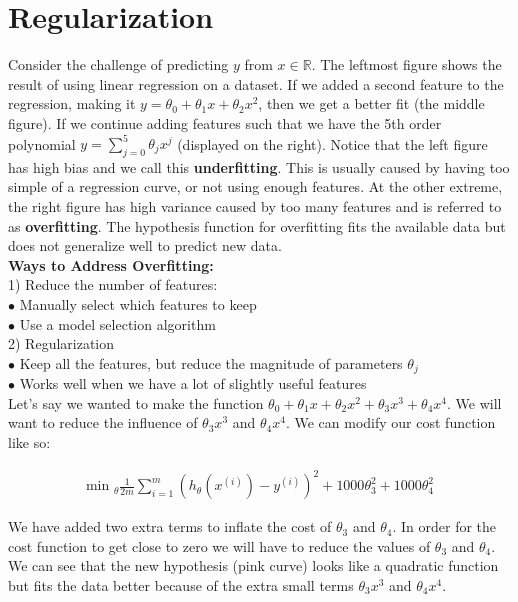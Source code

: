 \documentclass{article}
\begin{document}
    \section{Regularization}
        Consider the challenge of predicting $y$ from $x\in\mathbb{R}$. The leftmost figure shows the result
        of using linear regression on a dataset. If we added a second feature to the regression, making it
        $y=\theta_0+\theta_1 x+\theta_2 x^2$, then we get a better fit (the middle figure). If we continue
        adding features such that we have the 5th order polynomial $y=\sum^5_{j=0}\theta_j x^j$ (displayed
        on the right). Notice that the left figure has high bias and we call this \textbf{underfitting}.
        This is usually caused by having too simple of a regression curve, or not using enough features.
        At the other extreme, the right figure has high variance caused by too many features and is referred
        to as \textbf{overfitting}. The hypothesis function for overfitting fits the available data but
        does not generalize well to predict new data. \\

        \noindent \textbf{Ways to Address Overfitting:} \\
        1) Reduce the number of features: \\
        $\bullet$ Manually select which features to keep \\
        $\bullet$ Use a model selection algorithm \\
        2) Regularization \\
        $\bullet$ Keep all the features, but reduce the magnitude of parameters $\theta_j$ \\
        $\bullet$ Works well when we have a lot of slightly useful features \\

        \noindent Let's say we wanted to make the function $\theta_0 + \theta_1 x + \theta_2 x^2 + \theta_3 x^3
        + \theta_4 x^4$. We will want to reduce the influence of $\theta_3 x^3$ and $\theta_4 x^4$. We can
        modify our cost function like so:

        \begin{align*}
            \text{min }_{\theta} \frac{1}{2m} \sum^m_{i=1}(h_\theta(x^{(i)})-y^{(i)})^2 + 1000\theta^2_3 +
            1000\theta^2_4
        \end{align*}

        \noindent We have added two extra terms to inflate the cost of $\theta_3$ and $\theta_4$. In order for
        the cost function to get close to zero we will have to reduce the values of $\theta_3$ and $\theta_4$.
        We can see that the new hypothesis (pink curve) looks like a quadratic function but fits the data
        better because of the extra small terms $\theta_3 x^3$ and $\theta_4 x^4$.
\end{document}
